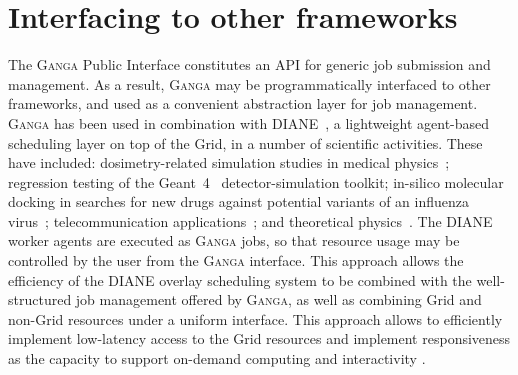 \documentclass{elsart}
\def\ganga {\textsc{Ganga}\xspace}
\def\diane {\textsc{DIANE}\xspace}
\def\grid {Grid\xspace}
\begin{document}
\section{Interfacing to other frameworks}
\label{sec:GangaInOtherFrameworks}
The \ganga Public Interface constitutes an API for generic job submission
and management.  As a result, \ganga may be programmatically
interfaced to other frameworks, and used as a convenient abstraction layer for
job management. \ganga has been used in combination with \diane~\cite{DIANE},
a lightweight agent-based
scheduling layer on top of the \grid, in a number
of scientific activities.  These have included: dosimetry-related simulation
studies in medical physics~\cite{Geant4MedicalDIANE}; regression testing of the Geant~4~\cite{Geant4}
detector-simulation toolkit;
in-silico molecular docking in searches for 
new drugs against potential variants of an influenza virus~\cite{AvianFlu};
telecommunication applications~\cite{ITU}; and theoretical physics~\cite{LQCD}. The
\diane worker agents are executed as \ganga jobs, so that resource usage
may be controlled by the user from the \ganga interface. This
approach allows the efficiency of the \diane overlay scheduling system
to be combined with the well-structured job management offered by \ganga, as well as
combining \grid and non-\grid resources under a uniform interface. This approach
allows to efficiently implement low-latency access to the \grid resources and implement
responsiveness as the capacity to support on-demand computing and interactivity 
\cite{SchedulingForResponsiveGrids}.
\end{document}
